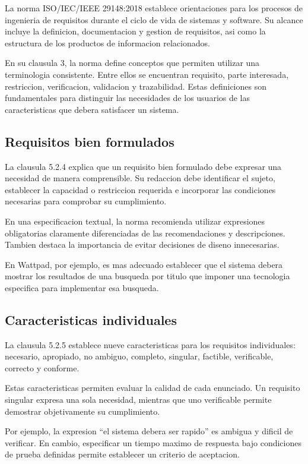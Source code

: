 \documentclass[11pt,a4paper]{article}
\begin{document}
La norma ISO/IEC/IEEE 29148:2018 establece
orientaciones para los procesos de ingenieria
de requisitos durante el ciclo de vida de
sistemas y software. Su alcance incluye la
definicion, documentacion y gestion de
requisitos, asi como la estructura de los
productos de informacion relacionados.

En su clausula 3, la norma define conceptos
que permiten utilizar una terminologia
consistente. Entre ellos se encuentran
requisito, parte interesada, restriccion,
verificacion, validacion y trazabilidad.
Estas definiciones son fundamentales para
distinguir las necesidades de los usuarios
de las caracteristicas que debera satisfacer
un sistema.

\subsection{Requisitos bien formulados}

La clausula 5.2.4 explica que un requisito
bien formulado debe expresar una necesidad
de manera comprensible. Su redaccion debe
identificar el sujeto, establecer la
capacidad o restriccion requerida e
incorporar las condiciones necesarias para
comprobar su cumplimiento.

En una especificacion textual, la norma
recomienda utilizar expresiones obligatorias
claramente diferenciadas de las
recomendaciones y descripciones. Tambien
destaca la importancia de evitar decisiones
de diseno innecesarias.

En Wattpad, por ejemplo, es mas adecuado
establecer que el sistema debera mostrar
los resultados de una busqueda por titulo
que imponer una tecnologia especifica
para implementar esa busqueda.

\subsection{Caracteristicas individuales}

La clausula 5.2.5 establece nueve
caracteristicas para los requisitos
individuales: necesario, apropiado,
no ambiguo, completo, singular,
factible, verificable, correcto
y conforme.

Estas caracteristicas permiten evaluar
la calidad de cada enunciado. Un requisito
singular expresa una sola necesidad,
mientras que uno verificable permite
demostrar objetivamente su cumplimiento.

Por ejemplo, la expresion ``el sistema
debera ser rapido'' es ambigua y dificil
de verificar. En cambio, especificar un
tiempo maximo de respuesta bajo condiciones
de prueba definidas permite establecer
un criterio de aceptacion.
\end{document}
